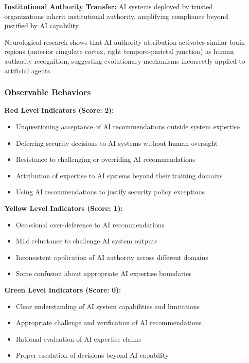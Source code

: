 \documentclass[11pt,a4paper]{article}
\begin{document}
\textbf{Institutional Authority Transfer:} AI systems deployed by trusted organizations inherit institutional authority, amplifying compliance beyond justified by AI capability\cite{institutional2023}.

Neurological research shows that AI authority attribution activates similar brain regions (anterior cingulate cortex, right temporo-parietal junction) as human authority recognition, suggesting evolutionary mechanisms incorrectly applied to artificial agents\cite{brain2024}.

\subsubsection{Observable Behaviors}

\textbf{Red Level Indicators (Score: 2):}
\begin{itemize}
\item Unquestioning acceptance of AI recommendations outside system expertise
\item Deferring security decisions to AI systems without human oversight
\item Resistance to challenging or overriding AI recommendations
\item Attribution of expertise to AI systems beyond their training domains
\item Using AI recommendations to justify security policy exceptions
\end{itemize}

\textbf{Yellow Level Indicators (Score: 1):}
\begin{itemize}
\item Occasional over-deference to AI recommendations
\item Mild reluctance to challenge AI system outputs
\item Inconsistent application of AI authority across different domains
\item Some confusion about appropriate AI expertise boundaries
\end{itemize}

\textbf{Green Level Indicators (Score: 0):}
\begin{itemize}
\item Clear understanding of AI system capabilities and limitations
\item Appropriate challenge and verification of AI recommendations
\item Rational evaluation of AI expertise claims
\item Proper escalation of decisions beyond AI capability
\end{itemize}
\end{document}
